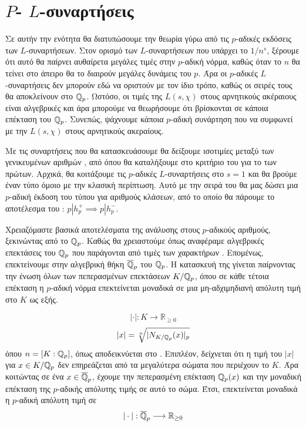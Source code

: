 \section{$P$- $L$-συναρτήσεις}

Σε αυτήν την ενότητα θα διατυπώσουμε την θεωρία γύρω από τις $p$-αδικές εκδόσεις των  $L$-συναρτήσεων. Στον ορισμό των 
$L$-συναρτήσεων που υπάρχει το $1/n^s$, ξέρουμε ότι αυτό θα παίρνει αυθαίρετα μεγάλες τιμές στην $p$-αδική νόρμα, καθώς όταν το $n$ θα 
τείνει στο άπειρο  θα το διαιρούν μεγάλες δυνάμεις του $p$. Άρα οι $p$-αδικές $L$-συναρτήσεις δεν μπορούν εδώ να οριστούν με τον ίδιο 
τρόπο, καθώς οι σειρές τους θα αποκλείνουν στο $\mathbb{Q}_p$. Ωστόσο, οι τιμές της $L(s,\chi)$ στους αρνητικούς ακέραιους είναι αλγεβρικές 
και άρα μπορούμε να θεωρήσουμε ότι βρίσκονται σε κάποια επέκταση του $\mathbb{Q}_p$. Συνεπώς, ψάχνουμε κάποια $p$-αδική συνάρτηση που να 
συμφωνεί με την $L(s,\chi)$ στους αρνητικούς ακεραίους. 

Με τις συναρτήσεις που θα κατασκευάσουμε θα δείξουμε ισοτιμίες μεταξύ των γενικευμένων αριθμών , από όπου θα καταλήξουμε 
στο κριτήριο του  για το  των πρώτων. Αρχικά, θα κοιτάξουμε τις $p$-αδικές $L$-συναρτήσεις στο $s=1$ και 
θα βρούμε έναν τύπο όμοιο με την κλασική περίπτωση. Αυτό με την σειρά του θα μας δώσει μια $p$-αδική έκδοση του τύπου  
για αριθμούς κλάσεων, από το οποίο θα πάρουμε το αποτέλεσμα του : $p|h^+_p \implies p |h^-_p$.

Χρειαζόμαστε βασικά αποτελέσματα της ανάλυσης στους $p$-αδικούς αριθμούς, ξεκινώντας από το $\mathbb{Q}_p$. Καθώς θα χρειαστούμε όπως αναφέραμε 
αλγεβρικές επεκτάσεις του $\mathbb{Q}_p$ που παράγονται από τιμές των χαρακτήρων . Επομένως, επεκτείνουμε στην αλγεβρική θήκη 
$\overline{\mathbb{Q}}_p$ του $\mathbb{Q}_p$. Η κατασκευή της γίνεται παίρνοντας την ένωση όλων των πεπερασμένων επεκτάσεων $K/\mathbb{Q}_p$, όπου σε κάθε 
τέτοια επέκταση η $p$-αδική νόρμα επεκτείνεται μοναδικά σε μια μη-αδχιμηδιανή απόλυτη τιμή στο $K$ ως εξής.

$$|\cdot |: K \longrightarrow \mathbb{R}_{\geq 0}$$
$$|x| =  \sqrt[n]{|N_{K/\mathbb{Q}_p}(x)|_p}$$
όπου $n=[K:\mathbb{Q}_p]$, όπως αποδεικνύεται στο \cite{Gouv}. Επιπλέον, δείχνεται ότι η τιμή του $|x|$ για $x \in K/\mathbb{Q}_p$ δεν επηρεάζεται 
από τα μεγαλύτερα σώματα που περιέχουν το $K$. Άρα κοιτώντας σε ένα $x \in \overline{\mathbb{Q}}_p$, έχουμε την πεπερασμένη επέκταση 
$\mathbb{Q}_p(x)$ και την μοναδική επέκταση της $p$-αδικής απόλυτης τιμής σε αυτό το σώμα. Έτσι, επεκτείνεται μοναδικά η $p$-αδική απόλυτη 
τιμή σε
$$|\cdot |: \overline{\mathbb{Q}}_p \longrightarrow \mathbb{R}_{\geq 0}$$

